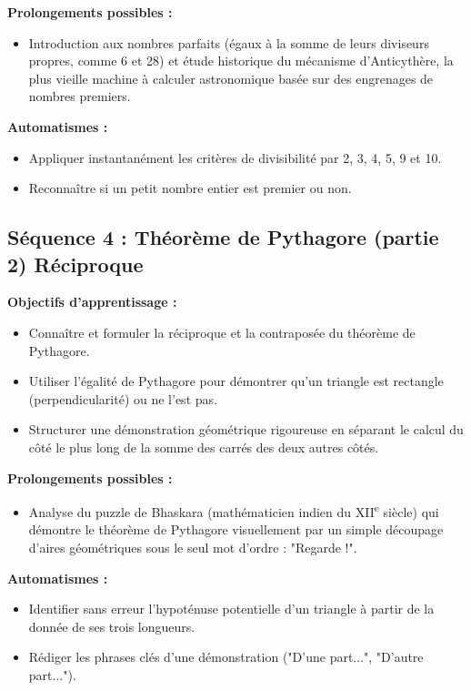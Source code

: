 \documentclass[11pt,a4paper]{article}
\begin{document}
\textbf{Prolongements possibles :}
\begin{itemize}
    \item Introduction aux nombres parfaits (égaux à la somme de leurs diviseurs propres, comme 6 et 28) et étude historique du mécanisme d'Anticythère, la plus vieille machine à calculer astronomique basée sur des engrenages de nombres premiers.
\end{itemize}

\textbf{Automatismes :}
\begin{itemize}
    \item Appliquer instantanément les critères de divisibilité par 2, 3, 4, 5, 9 et 10.
    \item Reconnaître si un petit nombre entier est premier ou non.
\end{itemize}

\subsection{Séquence 4 : Théorème de Pythagore (partie 2) Réciproque}
\textbf{Objectifs d’apprentissage :}
\begin{itemize}
    \item Connaître et formuler la réciproque et la contraposée du théorème de Pythagore.
    \item Utiliser l'égalité de Pythagore pour démontrer qu’un triangle est rectangle (perpendicularité) ou ne l’est pas.
    \item Structurer une démonstration géométrique rigoureuse en séparant le calcul du côté le plus long de la somme des carrés des deux autres côtés.
\end{itemize}

\textbf{Prolongements possibles :}
\begin{itemize}
    \item Analyse du puzzle de Bhaskara (mathématicien indien du XII\textsuperscript{e} siècle) qui démontre le théorème de Pythagore visuellement par un simple découpage d'aires géométriques sous le seul mot d'ordre : "Regarde !".
\end{itemize}

\textbf{Automatismes :}
\begin{itemize}
    \item Identifier sans erreur l'hypoténuse potentielle d'un triangle à partir de la donnée de ses trois longueurs.
    \item Rédiger les phrases clés d'une démonstration ("D'une part...", "D'autre part...").
\end{itemize}
\end{document}
